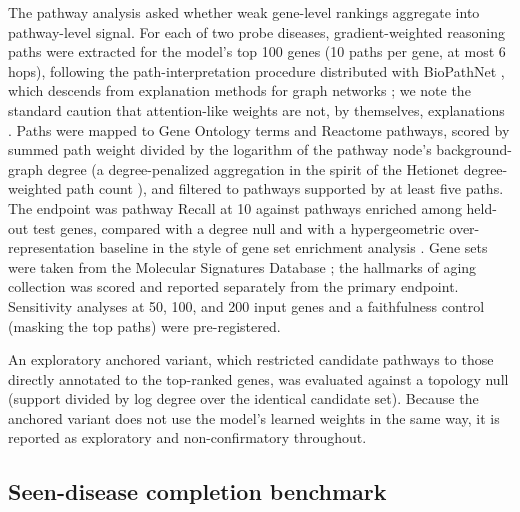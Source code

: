 \documentclass[11pt]{article}
\begin{document}
The pathway analysis asked whether weak gene-level rankings aggregate into pathway-level signal. For each of two probe diseases, gradient-weighted reasoning paths were extracted for the model's top 100 genes (10 paths per gene, at most 6 hops), following the path-interpretation procedure distributed with BioPathNet \cite{hu2026}, which descends from explanation methods for graph networks \cite{ying2019,sundararajan2017}; we note the standard caution that attention-like weights are not, by themselves, explanations \cite{jain2019}. Paths were mapped to Gene Ontology terms and Reactome pathways, scored by summed path weight divided by the logarithm of the pathway node's background-graph degree (a degree-penalized aggregation in the spirit of the Hetionet degree-weighted path count \cite{himmelstein2017}), and filtered to pathways supported by at least five paths. The endpoint was pathway Recall at 10 against pathways enriched among held-out test genes, compared with a degree null and with a hypergeometric over-representation baseline in the style of gene set enrichment analysis \cite{subramanian2005}. Gene sets were taken from the Molecular Signatures Database \cite{liberzon2015}; the hallmarks of aging collection \cite{lopezotin2013,lopezotin2023} was scored and reported separately from the primary endpoint. Sensitivity analyses at 50, 100, and 200 input genes and a faithfulness control (masking the top paths) were pre-registered.

An exploratory anchored variant, which restricted candidate pathways to those directly annotated to the top-ranked genes, was evaluated against a topology null (support divided by log degree over the identical candidate set). Because the anchored variant does not use the model's learned weights in the same way, it is reported as exploratory and non-confirmatory throughout.

\subsection{Seen-disease completion benchmark}
\end{document}
